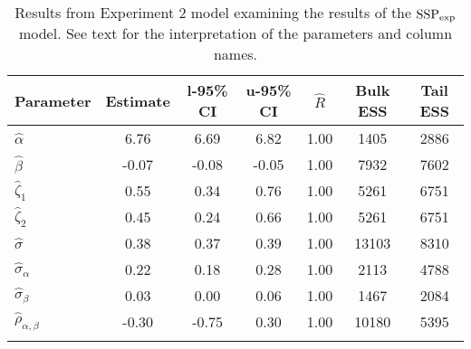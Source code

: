\begin{table}

\caption{Results from Experiment 2 model examining the results of the $\operatorname{SSP}_{\text{exp}}$ model. \label{tab:Experiment 2-SSP}See text for the interpretation of the parameters and column names.}

\begin{tabular}{l *3{S[table-format=-1.2]} S[table-format=1.2] *2{S[table-format=5.0]}}
\lsptoprule
Parameter & {Estimate} & {l-95\% CI} & {u-95\% CI} & {$\hat{R}$} & {Bulk ESS} & {Tail ESS}\\
\midrule
$\hat\alpha$ & 6.76 & 6.69 & 6.82 & 1.00 & 1405 & 2886\\
$\hat\beta$ & -0.07 & -0.08 & -0.05 & 1.00 & 7932 & 7602\\
$\hat\zeta_{1}$ & 0.55 & 0.34 & 0.76 & 1.00 & 5261 & 6751\\
$\hat\zeta_{2}$ & 0.45 & 0.24 & 0.66 & 1.00 & 5261 & 6751\\
$\hat\sigma$ & 0.38 & 0.37 & 0.39 & 1.00 & 13103 & 8310\\
$\hat\sigma_{\alpha}$ & 0.22 & 0.18 & 0.28 & 1.00 & 2113 & 4788\\
$\hat\sigma_{\beta}$ & 0.03 & 0.00 & 0.06 & 1.00 & 1467 & 2084\\
$\hat\rho_{\alpha,\beta}$ & -0.30 & -0.75 & 0.30 & 1.00 & 10180 & 5395\\
\lspbottomrule
\end{tabular}

\end{table}






